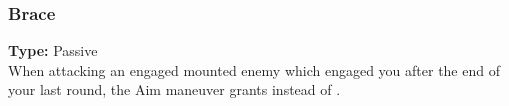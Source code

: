 \subsubsection{Brace}
\label{iqty:brace}
\textbf{Type:} Passive\\
When attacking an engaged mounted enemy
which engaged you after the end of your last round, the
Aim maneuver grants \boost\boost instead of \boost.
